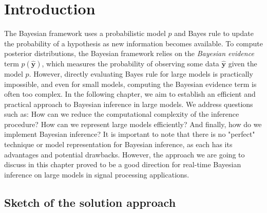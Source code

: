
\section{Introduction}\label{chapter-02:section:introduction}

The Bayesian framework uses a probabilistic model $p$ and Bayes rule to update
the probability of a hypothesis as new information becomes available. 
To compute posterior distributions, the Bayesian framework relies on the \textit{Bayesian evidence}
term $p(\hat{\bm{y}})$, which measures the probability of observing some data $\hat{\bm{y}}$ given
the model $p$.
However, directly evaluating Bayes rule for large models is practically impossible, and
even for small models, computing the Bayesian evidence term is often too complex.
In the following chapter, we aim to establish an efficient and practical approach to Bayesian
inference in large models.
We address questions such as: How can we reduce the computational complexity of the inference
procedure?
How can we represent large models efficiently?
And finally, how do we implement Bayesian inference?
It is important to note that there is no "perfect" technique or model representation for
Bayesian inference, as each has its advantages and potential drawbacks.
However, the approach we are going to discuss in this chapter proved to be a good direction
for real-time Bayesian inference on large models in signal processing applications.

\subsection*{Sketch of the solution approach}


